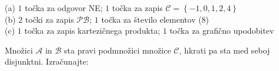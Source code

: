 \documentclass[addpoints]{exam}
\begin{document}
\begin{questions}


    \begin{solution}[10cm]
        (a) $1$ točka za odgovor NE; $1$ točka za zapis $\mathcal{C}=\left\{-1,0,1,2,4\right\}$ \\
        (b) $2$ točki za zapis $\mathcal{PB}$; $1$ točka za število elementov ($8$) \\
        (c) $1$ točka za zapis kartezičnega produkta; $1$ točka za grafično upodobitev
    \end{solution}



    \question[5]
    Množici $\mathcal{A}$ in $\mathcal{B}$ sta pravi podmnožici množice $\mathcal{C}$, hkrati pa sta med seboj disjunktni. Izračunajte:
\end{questions}
\end{document}
